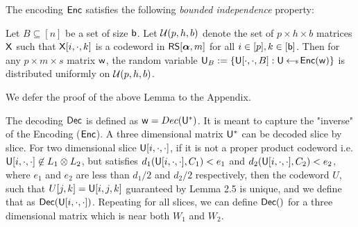 The encoding $\mathsf{Enc}$ satisfies the following {\em bounded independence} property:
\begin{lemma}\label{lem:boundedindependence}
Let $B\subseteq [n]$ be a set of size $\mathsf{b}$. Let $\mathcal{U}(p,h,b)$ denote the
set of $p\times h\times b$ matrices $\mathsf{X}$ such
that $\mathsf{X}[i,\cdot,k]$ is a codeword in $\mathsf{RS}[\bm{\alpha},m]$ for all $i\in
[p],k\in [\mathsf{b}]$. Then for any $p\times m\times s$ matrix $\mathsf{w}$, the random
variable $\mathsf{U}_B := \{\mathsf{U}[\cdot,\cdot,B]: \mathsf{U}\hskip2.3pt{\gets\!\!\mbox{\tiny${\$}$\normalsize}}\, \mathsf{Enc}(\mathsf{w})\}$ is
distributed uniformly on $\mathcal{U}(p,h,b)$.
\end{lemma}
We defer the proof of the above Lemma to the Appendix.

The decoding $\mathsf{Dec}$ is defined as $\mathsf{w} = Dec(\mathsf{U}^*)$. It is meant to capture the "inverse" of the Encoding ($\mathsf{Enc}$). A three dimensional matrix $\mathsf{U}^*$ can be decoded slice by slice. For two dimensional slice $\mathsf{U}[i,\cdot,\cdot]$,   if it is not a proper product codeword i.e. $\mathsf{U}[i,\cdot,\cdot] \not \in L_1 \otimes L_2 $, but satisfies $d_1(\mathsf{U}[i,\cdot,\cdot], C_1) < e_1$ and $d_2(\mathsf{U}[i,\cdot,\cdot],C_2) < e_2$, where $e_1$ and $e_2$ are less than $d_1/2$ and $d_2/2$ respectively, then the codeword $U$, such that $U[j,k] = \mathsf{U}[i,j,k]$ guaranteed by Lemma 2.5 is unique, and we define that as $\mathsf{Dec}(\mathsf{U}[i,\cdot,\cdot])$.  Repeating for all slices, we can define $\mathsf{Dec}()$ for a three dimensional matrix which is near both $W_1$ and $W_2$. 


